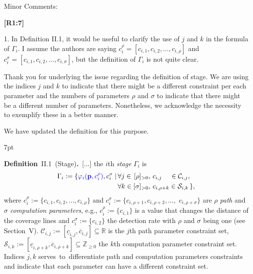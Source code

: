 \documentclass[10pt]{letter}
\newenvironment{formal}{%
  \def\FrameCommand{%
    \hspace{1pt}%
    {\color{red}\vrule width 2pt}%
    {\color{formalshade}\vrule width 4pt}%
    \colorbox{formalshade}%
  }%
  \MakeFramed{\advance\hsize-\width\FrameRestore}%
  \noindent\hspace{-4.55pt}%
  \begin{adjustwidth}{}{7pt}%
  \vspace{2pt}\vspace{2pt}%
}
{%
  \vspace{2pt}\end{adjustwidth}\endMakeFramed%
}
\begin{document}
\vspace{2em}


Minor Comments:

{\hspace*{-4.5em}\textbf{[R1:7]}\vspace*{-1.9em}}

1. In Definition II.1, it would be useful to clarify the use of $j$ and $k$ in the formula of $\Gamma_i$. I assume the authors are saying $c^\rho_i=[c_{i,1},c_{i,2},\dots,c_{i,\rho}]$ and $c^\sigma_i=[c_{i,1},c_{i,2},\dots,c_{i,\sigma}]$, but the definition of $\Gamma_i$ is not quite clear.

{\color{blue} 

{\hspace*{-4.5em}{[R1:7]}\vspace*{-1.9em}}

Thank you for underlying the issue regarding the definition of stage. We are using the indices $j$ and $k$ to indicate that there might be a different constraint per each parameter and the numbers of parameters $\rho$ and $\sigma$ to indicate that there might be a different number of parameters. Nonetheless, we acknowledge the necessity to exemplify these in a better manner.

We have updated the definition for this purpose.

\begin{formal}
  \color{black} 
  \textbf{Definition}~II.1~(Stage)\textbf{.}~[...] the $i$th \emph{stage} $\Gamma_i$ %
    is
  \begin{equation*}\begin{split}
      \Gamma_i:=\{{\color{blue}\varphi_i(\mathbf{p}%
      ,c_i^\rho)},c_i^\sigma\mid
      \,&\forall j\in\,[\rho]_{>0},\,c_{i,j}\,\,\,\,\,\,\,\in\mathcal{C}_{i,j},\,\\
        &\forall k\in[\sigma]_{>0},\,c_{i,\rho+k}\in\mathcal{S}_{i,k}\,\},
  \end{split}\end{equation*}
  where $c_i^\rho${\color{blue}$:=\{c_{i,1},c_{i,2},\dots,c_{i,\rho}\}$} and $c_i^\sigma${\color{blue}$:=\{c_{i,\rho+1},c_{i,\rho+2},\dots,$ $c_{i,\rho+\sigma}\}$} are $\rho$ \emph{path} and $\sigma$ \emph{computation parameters}{\color{blue}, e.g., $c_i^\rho:=\{c_{i,1}\}$ is a value that changes the distance of the coverage lines and $c^\sigma_i:=\{c_{i,2}\}$ the detection rate with $\rho$ and $\sigma$ being one (see Section~{\color{red}V})}. $\mathcal{C}_{i,j}:=[\underline{c}_{i,j},\overline{c}_{i,j}]\subseteq\mathbb{R}$ is the $j$th path parameter %
  constraint set, %
  $\mathcal{S}_{i,k}:=[\underline{c}_{i,\rho+k},\overline{c}_{i,\rho+k}]\subseteq\mathbb{Z}_{\geq 0}$ %
  the $k$th computation parameter constraint set. {\color{blue}Indices $j,k$ serves~to~differentiate path and computation parameters constraints and indicate that each parameter can have a different constraint set.}
  \vspace*{1ex}
\end{formal}

}
\end{document}
